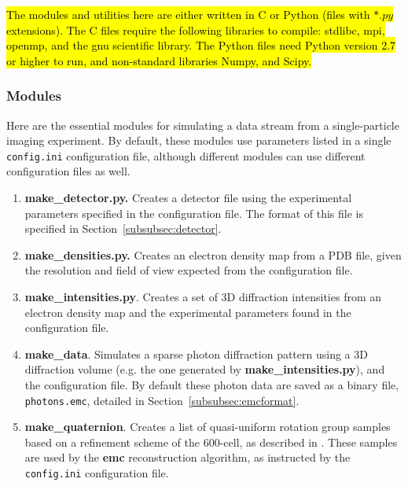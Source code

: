 \documentclass[preprint]{iucr}              %
\begin{document}
\hl{The modules and utilities here are either written in C or Python (files with $*.py$ extensions). The C files require the following libraries to compile: stdlibc, mpi, openmp, and the gnu scientific library. The Python files need Python version 2.7 or higher to run, and non-standard libraries Numpy, and Scipy.}

\subsubsection{Modules}\label{subsubsec:mods}
Here are the essential modules for simulating a data stream from a single-particle imaging experiment. By default, these modules use parameters listed in a single \texttt{config.ini} configuration file, although different modules can use different configuration files as well.

\begin{enumerate}
\item{\bf make\_detector.py.} Creates a detector file using the experimental parameters specified in the configuration file. The format of this file is specified in Section~\ref{subsubsec:detector}.
\item{\bf make\_densities.py.} Creates an electron density map from a PDB file, given the resolution and field of view expected from the configuration file.
\item{\bf make\_intensities.py}. Creates a set of 3D diffraction intensities from an electron density map and the experimental parameters found in the configuration file.  
\item{\bf make\_data}. Simulates a sparse photon diffraction pattern using a 3D diffraction volume (e.g. the one generated by {\bf make\_intensities.py}), and the configuration file. By default these photon data are saved as a binary file, \texttt{photons.emc}, detailed in Section~\ref{subsubsec:emcformat}.
\item{\bf make\_quaternion}. Creates a list of quasi-uniform rotation group samples based on a refinement scheme of the 600-cell, as described in . These samples are used by the {\bf emc} reconstruction algorithm, as instructed by the \texttt{config.ini} configuration file.
\end{enumerate}
\end{document}

